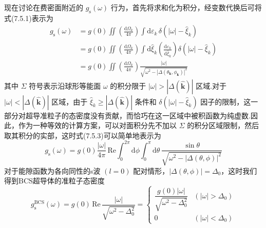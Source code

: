 现在讨论在费密面附近的 $g_{\mathrm{s}}\left(\omega\right)$ 行为，首先将求和化为积分，经变数代换后可将式(7.5.1)表示为
\begin{equation}
\begin{aligned}
  g_{\mathrm{s}}(\omega)&=g(0)\iint\left(\frac{\mathrm{d}\Omega_{k}}{4\pi}\right)
  \int\mathrm{d}\varepsilon_{k}\,\delta\left(\left|\omega\right|-\hat{\xi}_{k}\right)\\
  &=g(0)\iint\left(\frac{\mathrm{d}\Omega_{k}}{4\pi}\right)
  \int\mathrm{d}\hat{\xi}_{k}\left(\frac{\mathrm{d}\varepsilon_{k}}{\mathrm{d}\hat{\xi}_{k}}\right)
  \delta\left(\left|\omega\right|-\hat{\xi}_{k}\right)\\
  &=g(0)\iint\left(\frac{\mathrm{d}\Omega_{k}}{4\pi}\right)
  \frac{\left|\omega\right|}{\sqrt{\omega^{2}-\left|\Delta\left(\theta_{\boldsymbol{k}},\phi_{\boldsymbol{k}}\right)\right|^{2}}}
\end{aligned}
\end{equation}
其中 $\Sigma$ 符号表示沿球形等能面 $\omega$ 的积分限于 $\left|\omega\right|>\left|\Delta(\hat{\boldsymbol{k}})\right|$ 区域.对于 $\left|\omega\right|<\left|\Delta(\hat{\boldsymbol{k}})\right|$ 区域，由于 $\hat{\xi}_{k}\geqslant\left|\Delta(\hat{\boldsymbol{k}})\right|$ 条件和 $\delta\left(\left|\omega\right|-\hat{\xi}_{k}\right)$ 因子的限制，这一部分对超导准粒子的态密度没有贡献，而恰巧在这一区域中被积函数为纯虚数.因此，作为一种等效的计算方案，可以对面积分先不加以 $\Sigma$ 的积分区域限制，然后取其积分的实部，这时式(7.5.3)可以简单地表示为
\begin{equation}
  g_{\mathrm{s}}(\omega)=g(0)\frac{\left|\omega\right|}{4\pi}\,\mathrm{Re}
  \int_{0}^{2\pi}\mathrm{d}\phi\int_{0}^{\pi}\mathrm{d}\theta\,
  \frac{\sin\theta}{\sqrt{\omega^{2}-\left|\Delta(\theta,\phi)\right|^{2}}}
\end{equation}
对于能隙函数为各向同性的s波 $\left(l=0\right)$ 配对情形，$\left|\Delta(\theta,\phi)\right|=\Delta_{0}$，这时我们得到BCS超导体的准粒子态密度
\begin{equation}
  g_{\mathrm{s}}^{\mathrm{BCS}}(\omega)=g(0)\,\mathrm{Re}\,\frac{\left|\omega\right|}{\sqrt{\omega^{2}-\Delta_{0}^{2}}}
  =\begin{cases}
    \dfrac{g(0)\left|\omega\right|}{\sqrt{\omega^{2}-\Delta_{0}^{2}}}
    & \left(\left|\omega\right|>\Delta_{0}\right)\\[1em]
    0 & \left(\left|\omega\right|<\Delta_{0}\right)
  \end{cases}
\end{equation}
